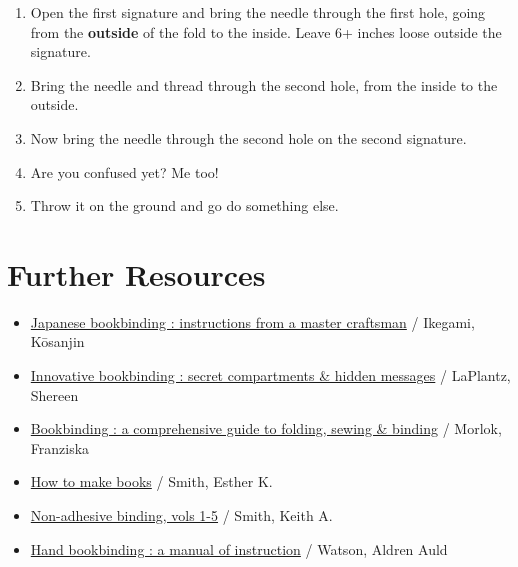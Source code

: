 \documentclass[
  openany]{book}
\providecommand{\tightlist}{%
  \setlength{\itemsep}{0pt}\setlength{\parskip}{0pt}}
\begin{document}
\begin{enumerate}
\def\labelenumi{\arabic{enumi}.}
\tightlist
\item
  Open the first signature and bring the needle through the first hole, going from the \textbf{outside} of the fold to the inside. Leave 6+ inches loose outside the signature.
\item
  Bring the needle and thread through the second hole, from the inside to the outside.
\item
  Now bring the needle through the second hole on the second signature.
\item
  Are you confused yet? Me too!
\item
  Throw it on the ground and go do something else.
\end{enumerate}

\chapter{Further Resources}\label{further-resources}

\begin{itemize}
\tightlist
\item
  \href{https://search.worldcat.org/title/11866980}{Japanese bookbinding : instructions from a master craftsman} / Ikegami, Kōsanjin
\item
  \href{https://search.worldcat.org/title/37809087}{Innovative bookbinding : secret compartments \& hidden messages} / LaPlantz, Shereen
\item
  \href{https://search.worldcat.org/title/1047524099}{Bookbinding : a comprehensive guide to folding, sewing \& binding} / Morlok, Franziska
\item
  \href{https://search.worldcat.org/title/123349651}{How to make books} / Smith, Esther K.
\item
  \href{https://search.worldcat.org/title/43303159}{Non-adhesive binding, vols 1-5} / Smith, Keith A.
\item
  \href{https://search.worldcat.org/title/964990}{Hand bookbinding : a manual of instruction} / Watson, Aldren Auld
\end{itemize}
\end{document}
